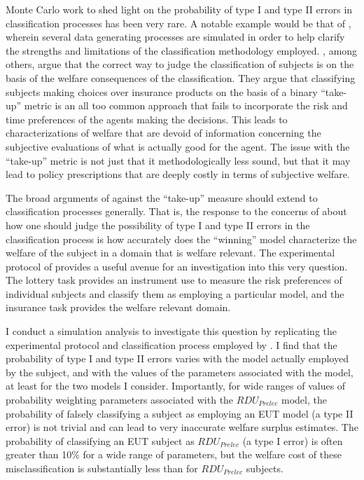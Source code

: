 \documentclass[../main.tex]{subfiles}
\begin{document}
Monte Carlo work to shed light on the probability of type I and type II errors in classification processes has been very rare.
A notable example would be that of \textcite{Wilcox2015}, wherein several data generating processes are simulated in order to help clarify the strengths and limitations of the classification methodology employed.
\textcite{Harrison2016}, among others, argue that the correct way to judge the classification of subjects is on the basis of the welfare consequences of the classification.
They argue that classifying subjects making choices over insurance products on the basis of a binary \enquote{take-up} metric is an all too common approach that fails to incorporate the risk and time preferences of the agents making the decisions.
This leads to characterizations of welfare that are devoid of information concerning the subjective evaluations of what is actually good for the agent.
The issue with the \enquote{take-up} metric is not just that it methodologically less sound, but that it may lead to policy prescriptions that are deeply costly in terms of subjective welfare.

The broad arguments of \textcite{Harrison2016} against the \enquote{take-up} measure should extend to classification processes generally.
That is, the response to the concerns of \textcite{Hey1994} about how one should judge the possibility of type I and type II errors in the classification process is how accurately does the \enquote{winning} model characterize the welfare of the subject in a domain that is welfare relevant.
The experimental protocol of \textcite{Harrison2016} provides a useful avenue for an investigation into this very question.
The lottery task provides an instrument use to measure the risk preferences of individual subjects and classify them as employing a particular model, and the insurance task provides the welfare relevant domain.

I conduct a simulation analysis to investigate this question by replicating the experimental protocol and classification process employed by \textcite{Harrison2016}.
I find that the probability of type I and type II errors varies with the model actually employed by the subject, and with the values of the parameters associated with the model, at least for the two models I consider.
Importantly, for wide ranges of values of probability weighting parameters associated with the $\mathit{RDU_{Prelec}}$ model, the probability of falsely classifying a subject as employing an EUT model (a type II error) is not trivial and can lead to very inaccurate welfare surplus estimates.
The probability of classifying an EUT subject as $\mathit{RDU_{Prelec}}$ (a type I error) is often greater than 10\% for a wide range of parameters, but the welfare cost of these misclassification is substantially less than for $\mathit{RDU_{Prelec}}$ subjects.
\end{document}
